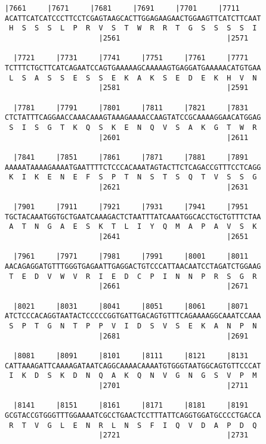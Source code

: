\documentclass{article}
\begin{document}
\newpage
\begin{Verbatim}[fontfamily=courier]
  |7661     |7671     |7681     |7691     |7701     |7711   
ACATTCATCATCCCTTCCTCGAGTAAGCACTTGGAGAAGAACTGGAAGTTCATCTTCAAT
 H  S  S  S  L  P  R  V  S  T  W  R  R  T  G  S  S  S  S  I 
                      |2561                         |2571   

  |7721     |7731     |7741     |7751     |7761     |7771   
TCTTTCTGCTTCATCAGAATCCAGTGAAAAAGCAAAAAGTGAGGATGAAAAACATGTGAA
 L  S  A  S  S  E  S  S  E  K  A  K  S  E  D  E  K  H  V  N 
                      |2581                         |2591   

  |7781     |7791     |7801     |7811     |7821     |7831   
CTCTATTTCAGGAACCAAACAAAGTAAAGAAAACCAAGTATCCGCAAAAGGAACATGGAG
 S  I  S  G  T  K  Q  S  K  E  N  Q  V  S  A  K  G  T  W  R 
                      |2601                         |2611   

  |7841     |7851     |7861     |7871     |7881     |7891   
AAAAATAAAAGAAAATGAATTTTCTCCCACAAATAGTACTTCTCAGACCGTTTCCTCAGG
 K  I  K  E  N  E  F  S  P  T  N  S  T  S  Q  T  V  S  S  G 
                      |2621                         |2631   

  |7901     |7911     |7921     |7931     |7941     |7951   
TGCTACAAATGGTGCTGAATCAAAGACTCTAATTTATCAAATGGCACCTGCTGTTTCTAA
 A  T  N  G  A  E  S  K  T  L  I  Y  Q  M  A  P  A  V  S  K 
                      |2641                         |2651   

  |7961     |7971     |7981     |7991     |8001     |8011   
AACAGAGGATGTTTGGGTGAGAATTGAGGACTGTCCCATTAACAATCCTAGATCTGGAAG
 T  E  D  V  W  V  R  I  E  D  C  P  I  N  N  P  R  S  G  R 
                      |2661                         |2671   

  |8021     |8031     |8041     |8051     |8061     |8071   
ATCTCCCACAGGTAATACTCCCCCGGTGATTGACAGTGTTTCAGAAAAGGCAAATCCAAA
 S  P  T  G  N  T  P  P  V  I  D  S  V  S  E  K  A  N  P  N 
                      |2681                         |2691   

  |8081     |8091     |8101     |8111     |8121     |8131   
CATTAAAGATTCAAAAGATAATCAGGCAAAACAAAATGTGGGTAATGGCAGTGTTCCCAT
 I  K  D  S  K  D  N  Q  A  K  Q  N  V  G  N  G  S  V  P  M 
                      |2701                         |2711   

  |8141     |8151     |8161     |8171     |8181     |8191   
GCGTACCGTGGGTTTGGAAAATCGCCTGAACTCCTTTATTCAGGTGGATGCCCCTGACCA
 R  T  V  G  L  E  N  R  L  N  S  F  I  Q  V  D  A  P  D  Q 
                      |2721                         |2731   

\end{Verbatim}
\end{document}
